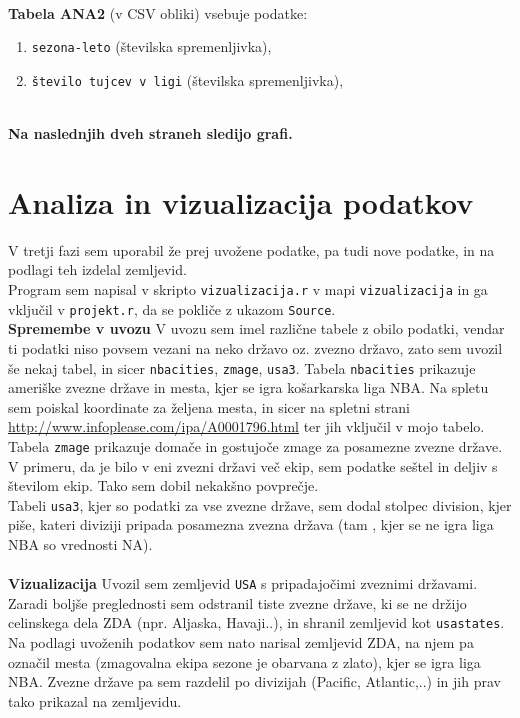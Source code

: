 \documentclass[11pt,a4paper]{article}
\begin{document}
\\
\textbf{Tabela ANA2} (v CSV obliki) vsebuje podatke:
\begin{enumerate}
\item{\verb|sezona-leto| (številska spremenljivka),}
\item{\verb|število tujcev v ligi| (številska spremenljivka),}
\end{enumerate}
\\

\textbf{Na naslednjih dveh straneh sledijo grafi.}





\section{Analiza in vizualizacija podatkov}

V tretji fazi sem uporabil že prej uvožene podatke, pa tudi nove podatke, in na podlagi teh izdelal zemljevid.\\

Program sem napisal v skripto \verb|vizualizacija.r| v mapi \verb|vizualizacija| in ga vključil v \verb|projekt.r|, da se pokliče z ukazom \verb|Source|.\\

\textbf{Spremembe v uvozu}
V uvozu sem imel različne tabele z obilo podatki, vendar ti podatki niso povsem vezani na neko državo oz. zvezno državo, zato sem uvozil še nekaj tabel, in sicer \verb|nbacities|, \verb|zmage|, \verb|usa3|. Tabela \verb|nbacities| prikazuje ameriške zvezne države in mesta, kjer se igra košarkarska liga NBA. Na spletu sem poiskal koordinate za željena mesta, in sicer na spletni strani \url{http://www.infoplease.com/ipa/A0001796.html} ter jih vključil v mojo tabelo.\\

Tabela \verb|zmage| prikazuje domače in gostujoče zmage za posamezne zvezne države. V primeru, da je bilo v eni zvezni državi več ekip, sem podatke seštel in deljiv s številom ekip. Tako sem dobil nekakšno povprečje.\\

Tabeli \verb|usa3|, kjer so podatki za vse zvezne države, sem dodal stolpec division, kjer piše, kateri diviziji pripada posamezna zvezna država (tam , kjer se ne igra liga NBA so vrednosti NA).\\
\\
\textbf{Vizualizacija}
\newline
Uvozil sem zemljevid \verb|USA| s pripadajočimi zveznimi državami. Zaradi boljše preglednosti sem odstranil tiste zvezne države, ki se ne držijo celinskega dela ZDA (npr. Aljaska, Havaji..), in shranil zemljevid kot \verb|usastates|. Na podlagi uvoženih podatkov sem nato narisal zemljevid ZDA, na njem pa označil mesta (zmagovalna ekipa sezone je obarvana z zlato), kjer se igra liga NBA. Zvezne države pa sem razdelil po divizijah (Pacific, Atlantic,..) in jih prav tako prikazal na zemljevidu.\\
\end{document}
